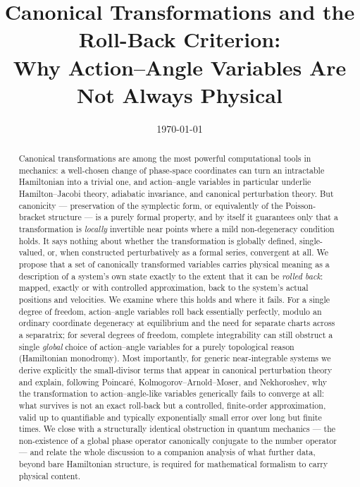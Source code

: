 \documentclass[11pt]{article}
\title{Canonical Transformations and the Roll-Back Criterion:\\
Why Action--Angle Variables Are Not Always Physical}
\author{}
\date{\today}
\begin{document}
\maketitle

\begin{abstract}
\noindent
Canonical transformations are among the most powerful computational tools in mechanics: a well-chosen change of phase-space coordinates can turn an intractable Hamiltonian into a trivial one, and action--angle variables in particular underlie Hamilton--Jacobi theory, adiabatic invariance, and canonical perturbation theory. But canonicity --- preservation of the symplectic form, or equivalently of the Poisson-bracket structure --- is a purely formal property, and by itself it guarantees only that a transformation is \emph{locally} invertible near points where a mild non-degeneracy condition holds. It says nothing about whether the transformation is globally defined, single-valued, or, when constructed perturbatively as a formal series, convergent at all. We propose that a set of canonically transformed variables carries physical meaning as a description of a system's own state exactly to the extent that it can be \emph{rolled back}: mapped, exactly or with controlled approximation, back to the system's actual positions and velocities. We examine where this holds and where it fails. For a single degree of freedom, action--angle variables roll back essentially perfectly, modulo an ordinary coordinate degeneracy at equilibrium and the need for separate charts across a separatrix; for several degrees of freedom, complete integrability can still obstruct a single \emph{global} choice of action--angle variables for a purely topological reason (Hamiltonian monodromy). Most importantly, for generic near-integrable systems we derive explicitly the small-divisor terms that appear in canonical perturbation theory and explain, following Poincar\'e, Kolmogorov--Arnold--Moser, and Nekhoroshev, why the transformation to action--angle-like variables generically fails to converge at all: what survives is not an exact roll-back but a controlled, finite-order approximation, valid up to quantifiable and typically exponentially small error over long but finite times. We close with a structurally identical obstruction in quantum mechanics --- the non-existence of a global phase operator canonically conjugate to the number operator --- and relate the whole discussion to a companion analysis of what further data, beyond bare Hamiltonian structure, is required for mathematical formalism to carry physical content.
\end{abstract}
\end{document}

